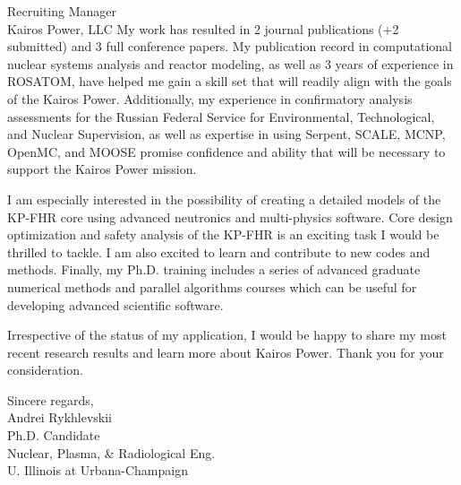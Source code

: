 \documentclass[11pt]{letter} %
\newcommand{\RecipientName}{Recruiting Manager\xspace}
\newcommand{\RecipientAddress}{Kairos Power, LLC}
\begin{document}
\begin{letter}{\RecipientName\\
        \RecipientAddress\xspace}
My work has resulted in 2 journal publications (+2 submitted) and 3 full 
conference papers. My publication record in computational nuclear systems 
analysis and reactor modeling, as well as 3 years of experience in ROSATOM, 
have helped me gain a skill set that will readily align with the goals of the 
Kairos Power. Additionally, my experience in confirmatory analysis assessments 
for the Russian Federal Service for Environmental, Technological, and Nuclear 
Supervision, as well as expertise in using Serpent, SCALE, MCNP, OpenMC, and 
MOOSE promise confidence and ability that will be necessary to support the 
Kairos Power mission. 

I am especially interested in the possibility of creating a detailed models of 
the KP-FHR core using advanced neutronics and multi-physics software. Core 
design optimization and safety analysis of the KP-FHR is an exciting task I 
would be thrilled to tackle. I am also excited to learn and contribute 
to new codes and methods. Finally, my Ph.D. training includes a series of 
advanced graduate numerical methods and parallel algorithms courses which can 
be useful for developing advanced scientific software.

Irrespective of the status of my application, I would be happy to share my 
most recent research results and learn more about Kairos Power. Thank you for 
your consideration.

\closing{Sincere regards,\\
{Andrei Rykhlevskii\\
Ph.D. Candidate\\
Nuclear, Plasma, \& Radiological Eng.\\
U. Illinois at Urbana-Champaign}
}


\end{letter}
\end{document}
